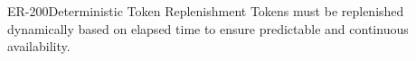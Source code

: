 \begin{equipmentrequirement}{ER-200}{Deterministic Token Replenishment}
    Tokens must be replenished dynamically based on elapsed time to ensure predictable and continuous availability.
\end{equipmentrequirement}